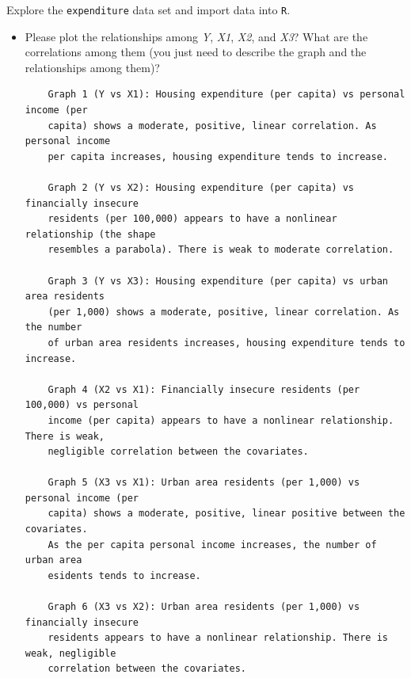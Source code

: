 \documentclass[12pt,letterpaper]{article}
\begin{document}
\vspace{.5cm}
\noindent Explore the \texttt{expenditure} data set and import data into \texttt{R}.
\vspace{.5cm}
  

\vspace{.1cm}
\begin{itemize}

\item
Please plot the relationships among \emph{Y}, \emph{X1}, \emph{X2}, and \emph{X3}? What are the correlations among them (you just need to describe the graph and the relationships among them)?


\begin{verbatim}
	Graph 1 (Y vs X1): Housing expenditure (per capita) vs personal income (per 
	capita) shows a moderate, positive, linear correlation. As personal income 
	per capita increases, housing expenditure tends to increase.
	
	Graph 2 (Y vs X2): Housing expenditure (per capita) vs financially insecure
	residents (per 100,000) appears to have a nonlinear relationship (the shape
	resembles a parabola). There is weak to moderate correlation. 
	
	Graph 3 (Y vs X3): Housing expenditure (per capita) vs urban area residents
	(per 1,000) shows a moderate, positive, linear correlation. As the number 
	of urban area residents increases, housing expenditure tends to increase. 

	Graph 4 (X2 vs X1): Financially insecure residents (per 100,000) vs personal
	income (per capita) appears to have a nonlinear relationship. There is weak,
	negligible correlation between the covariates.
	
	Graph 5 (X3 vs X1): Urban area residents (per 1,000) vs personal income (per
	capita) shows a moderate, positive, linear positive between the covariates. 
	As the per capita personal income increases, the number of urban area 
	esidents tends to increase. 
	
	Graph 6 (X3 vs X2): Urban area residents (per 1,000) vs financially insecure
	residents appears to have a nonlinear relationship. There is weak, negligible
	correlation between the covariates.
\end{verbatim}


\end{itemize}
\end{document}
